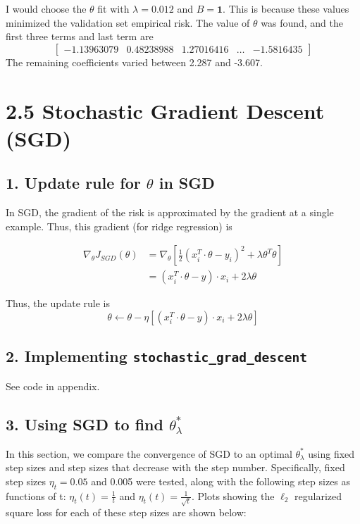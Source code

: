 \documentclass[paper=a4, fontsize=11pt]{scrartcl} %
\numberwithin{equation}{section} %
\numberwithin{figure}{section} %
\numberwithin{table}{section} %
\begin{document}
I would choose the $\theta$ fit with $\lambda = 0.012$ and $B = \textbf{1}$. This is because these values minimized the validation set empirical risk. The value of $\theta$ was found, and the first three terms and last term are
\[\begin{bmatrix}-1.13963079  & 0.48238988  & 1.27016416  & \dots & -1.5816435 \end{bmatrix}\]
The remaining coefficients varied between 2.287 and -3.607.


\section*{2.5 Stochastic Gradient Descent (SGD)}

\subsection*{1. Update rule for $\theta$ in SGD}

In SGD, the gradient of the risk is approximated by the gradient at a single example. Thus, this gradient (for ridge regression) is

\begin{align*}
\nabla_{\theta} J_{SGD}(\theta) &= \nabla_{\theta} \left[ \frac{1}{2} (x_i^T \cdot \theta - y_i)^2 + \lambda \theta^T \theta \right] \\
	&= (x_i^T \cdot \theta -y) \cdot x_i + 2 \lambda \theta
\end{align*}

Thus, the update rule is
\[
\theta \leftarrow \theta - \eta \left[ (x_i^T \cdot \theta -y) \cdot x_i + 2 \lambda \theta \right]\]

\subsection*{2. Implementing \texttt{stochastic\_grad\_descent}}

See code in appendix.

\subsection*{3. Using SGD to find $\theta_{\lambda}^*$}

In this section, we compare the  convergence of SGD to an optimal $\theta_{\lambda}^*$ using fixed step sizes and step sizes that decrease with the step number. Specifically, fixed step sizes $\eta_t = 0.05$ and 0.005 were tested, along with the following step sizes as functions of t: $\eta_t(t) = \frac{1}{t}$ and $\eta_t(t) = \frac{1}{\sqrt{t}}$. Plots showing the $\ell_2$ regularized square loss for each of these step sizes are shown below:
\end{document}
